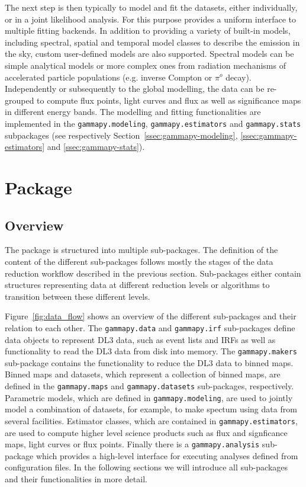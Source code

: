 \documentclass[traditabstract, longauth]{aa}
\newcommand{\code}[1]{\texttt{#1}}
\begin{document}
The next step is then typically to model and fit the datasets, either
individually, or in a joint likelihood analysis. For this purpose \gammapy
provides a uniform interface to multiple fitting backends. In addition to
providing a variety of built-in models, including spectral,
spatial and temporal model classes to describe the \gammaray emission in the sky,
custom user-defined models are also supported.
Spectral models can be simple analytical models or more complex ones from radiation
mechanisms of accelerated particle populations (e.g. inverse Compton or $\pi^{o}$ decay).
Independently or subsequently to the global modelling, the data can be
re-grouped to compute flux points, light curves and flux as well as significance
maps in different energy bands.
The modelling and fitting functionalities are implemented in the \code{gammapy.modeling},
\code{gammapy.estimators} and \code{gammapy.stats} subpackages (see respectively
Section~\ref{ssec:gammapy-modeling}, \ref{ssec:gammapy-estimators} and \ref{ssec:gammapy-stats}).

\section{\gammapy Package}
\label{sec:gammapy-package}
\subsection{Overview}
\label{ssec:overview}
%
%
The \gammapy package is structured into multiple sub-packages. The definition
of the content of the different sub-packages follows mostly the stages of the
data reduction workflow described in the previous section. Sub-packages
either contain structures representing data at different reduction
levels or algorithms to transition between these different levels.

Figure~\ref{fig:data_flow} shows an overview of the different sub-packages and
their relation to each other. The \code{gammapy.data} and \code{gammapy.irf}
sub-packages define data objects to represent DL3 data, such as
event lists and IRFs as well as functionality
to read the DL3 data from disk into memory. The \code{gammapy.makers} sub-package
contains the functionality to reduce the DL3 data to binned maps.
Binned maps and datasets, which represent a collection of binned
maps, are defined in the \code{gammapy.maps} and \code{gammapy.datasets}
sub-packages, respectively. Parametric models, which are defined in
\code{gammapy.modeling}, are used to jointly model a combination
of datasets, for example, to make spectum using data from several facilities. Estimator classes,
which are contained in \code{gammapy.estimators}, are used to
compute higher level science products such as flux and signficance maps,
light curves or flux points. Finally there is a \code{gammapy.analysis}
sub-package which provides a high-level interface for executing analyses
defined from configuration files. In the following sections we will
introduce all sub-packages and their functionalities in more detail.
\end{document}
